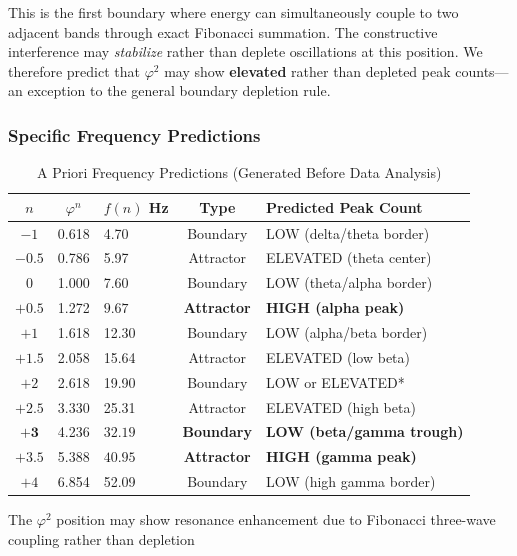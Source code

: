 \documentclass[11pt,a4paper]{article}
\newcommand{\phisym}{\varphi}
\begin{document}
This is the first boundary where energy can simultaneously couple to two adjacent bands through exact Fibonacci summation. The constructive interference may \textit{stabilize} rather than deplete oscillations at this position. We therefore predict that $\phisym^2$ may show \textbf{elevated} rather than depleted peak counts---an exception to the general boundary depletion rule.

\subsubsection{Specific Frequency Predictions}

\begin{table}[H]
\centering
\caption{A Priori Frequency Predictions (Generated Before Data Analysis)}
\label{tab:predictions}
\begin{tabular}{@{}cclcl@{}}
\toprule
$n$ & $\phisym^n$ & $f(n)$ Hz & Type & Predicted Peak Count \\
\midrule
$-1$ & 0.618 & 4.70 & Boundary & LOW (delta/theta border) \\
$-0.5$ & 0.786 & 5.97 & Attractor & ELEVATED (theta center) \\
$0$ & 1.000 & 7.60 & Boundary & LOW (theta/alpha border) \\
$\mathbf{+0.5}$ & 1.272 & $\mathbf{9.67}$ & \textbf{Attractor} & \textbf{HIGH (alpha peak)} \\
$+1$ & 1.618 & 12.30 & Boundary & LOW (alpha/beta border) \\
$+1.5$ & 2.058 & 15.64 & Attractor & ELEVATED (low beta) \\
$+2$ & 2.618 & 19.90 & Boundary & LOW or ELEVATED* \\
$+2.5$ & 3.330 & 25.31 & Attractor & ELEVATED (high beta) \\
$\mathbf{+3}$ & 4.236 & $\mathbf{32.19}$ & \textbf{Boundary} & \textbf{LOW (beta/gamma trough)} \\
$\mathbf{+3.5}$ & 5.388 & $\mathbf{40.95}$ & \textbf{Attractor} & \textbf{HIGH (gamma peak)} \\
$+4$ & 6.854 & 52.09 & Boundary & LOW (high gamma border) \\
\bottomrule
\end{tabular}
\begin{tablenotes}
\small
\item *The $\phisym^2$ position may show resonance enhancement due to Fibonacci three-wave coupling rather than depletion
\end{tablenotes}
\end{table}
\end{document}
